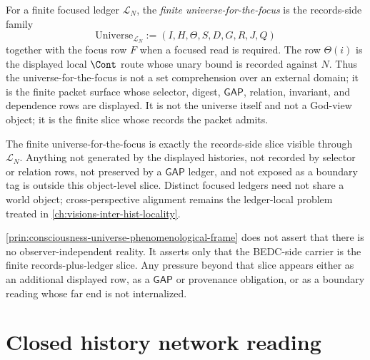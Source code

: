 \begin{definition}
\label{def:consciousness-universe-universe-for-observer}
For a finite focused ledger $\mathcal{L}_N$, the \emph{finite universe-for-the-focus} is the records-side family
$$
\mathrm{Universe}_{\mathcal{L}_N}
  := (I,H,\Theta,S,D,G,R,J,Q)
$$
together with the focus row $F$ when a focused read is required. The row $\Theta(i)$ is the displayed local $\Cont$ route whose unary bound is recorded against $N$. Thus the universe-for-the-focus is not a set comprehension over an external domain; it is the finite packet surface whose selector, digest, $\mathsf{GAP}$, relation, invariant, and dependence rows are displayed. It is not the universe itself and not a God-view object; it is the finite slice whose records the packet admits.
\end{definition}

\begin{principle}
\label{prin:consciousness-universe-phenomenological-frame}
The finite universe-for-the-focus is exactly the records-side slice visible through $\mathcal{L}_N$. Anything not generated by the displayed histories, not recorded by selector or relation rows, not preserved by a $\mathsf{GAP}$ ledger, and not exposed as a boundary tag is outside this object-level slice. Distinct focused ledgers need not share a world object; cross-perspective alignment remains the ledger-local problem treated in \autoref{ch:visions-inter-hist-locality}.
\end{principle}

\begin{remark}
\label{rem:consciousness-universe-structural-not-metaphysical}
\autoref{prin:consciousness-universe-phenomenological-frame} does not assert that there is no observer-independent reality. It asserts only that the BEDC-side carrier is the finite records-plus-ledger slice. Any pressure beyond that slice appears either as an additional displayed row, as a $\mathsf{GAP}$ or provenance obligation, or as a boundary reading whose far end is not internalized.
\end{remark}

\section{Closed history network reading}
\label{sec:consciousness-universe-closed-history-network}

